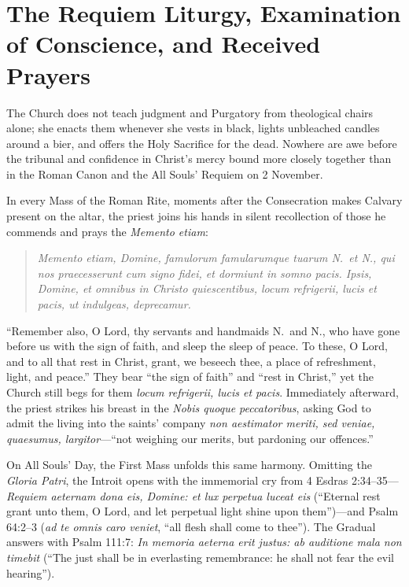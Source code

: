 \section{The Requiem Liturgy, Examination of Conscience, and Received Prayers}

The Church does not teach judgment and Purgatory from theological chairs alone; she enacts them whenever she vests in black, lights unbleached candles around a bier, and offers the Holy Sacrifice for the dead. Nowhere are awe before the tribunal and confidence in Christ's mercy bound more closely together than in the Roman Canon and the All Souls' Requiem on 2 November.

In every Mass of the Roman Rite, moments after the Consecration makes Calvary present on the altar, the priest joins his hands in silent recollection of those he commends and prays the \textit{Memento etiam}:

\begin{quote}
\textit{Memento etiam, Domine, famulorum famularumque tuarum N.\ et N., qui nos praecesserunt cum signo fidei, et dormiunt in somno pacis. Ipsis, Domine, et omnibus in Christo quiescentibus, locum refrigerii, lucis et pacis, ut indulgeas, deprecamur.}
\end{quote}

``Remember also, O Lord, thy servants and handmaids N.\ and N., who have gone before us with the sign of faith, and sleep the sleep of peace. To these, O Lord, and to all that rest in Christ, grant, we beseech thee, a place of refreshment, light, and peace.'' They bear ``the sign of faith'' and ``rest in Christ,'' yet the Church still begs for them \textit{locum refrigerii, lucis et pacis}. Immediately afterward, the priest strikes his breast in the \textit{Nobis quoque peccatoribus}, asking God to admit the living into the saints' company \textit{non aestimator meriti, sed veniae, quaesumus, largitor}---``not weighing our merits, but pardoning our offences.''

On All Souls' Day, the First Mass unfolds this same harmony. Omitting the \textit{Gloria Patri}, the Introit opens with the immemorial cry from 4 Esdras 2:34--35---\textit{Requiem aeternam dona eis, Domine: et lux perpetua luceat eis} (``Eternal rest grant unto them, O Lord, and let perpetual light shine upon them'')---and Psalm 64:2--3 (\textit{ad te omnis caro veniet}, ``all flesh shall come to thee''). The Gradual answers with Psalm 111:7: \textit{In memoria aeterna erit justus: ab auditione mala non timebit} (``The just shall be in everlasting remembrance: he shall not fear the evil hearing'').

